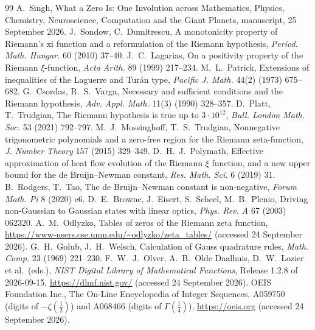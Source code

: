 \documentclass[11pt]{article}
\theoremstyle{definition}\newtheorem{definition}[theorem]{Definition}
\theoremstyle{remark}\newtheorem{remark}[theorem]{Remark}
\begin{document}
\begin{thebibliography}{99}
 A.~Singh, What a Zero Is: One Involution across Mathematics, Physics, Chemistry, Neuroscience, Computation and the Giant Planets, manuscript, 25 September 2026.
 J.~Sondow, C.~Dumitrescu, A monotonicity property of Riemann's xi function and a reformulation of the Riemann hypothesis, \emph{Period. Math. Hungar.} 60 (2010) 37--40.
 J.~C.~Lagarias, On a positivity property of the Riemann $\xi$-function, \emph{Acta Arith.} 89 (1999) 217--234.
 M.~L.~Patrick, Extensions of inequalities of the Laguerre and Tur\'an type, \emph{Pacific J. Math.} 44(2) (1973) 675--682.
 G.~Csordas, R.~S.~Varga, Necessary and sufficient conditions and the Riemann hypothesis, \emph{Adv. Appl. Math.} 11(3) (1990) 328--357.
 D.~Platt, T.~Trudgian, The Riemann hypothesis is true up to $3\cdot10^{12}$, \emph{Bull. London Math. Soc.} 53 (2021) 792--797.
 M.~J.~Mossinghoff, T.~S.~Trudgian, Nonnegative trigonometric polynomials and a zero-free region for the Riemann zeta-function, \emph{J. Number Theory} 157 (2015) 329--349.
 D.~H.~J.~Polymath, Effective approximation of heat flow evolution of the Riemann $\xi$ function, and a new upper bound for the de Bruijn--Newman constant, \emph{Res. Math. Sci.} 6 (2019) 31.
 B.~Rodgers, T.~Tao, The de Bruijn--Newman constant is non-negative, \emph{Forum Math. Pi} 8 (2020) e6.
 D.~E.~Browne, J.~Eisert, S.~Scheel, M.~B.~Plenio, Driving non-Gaussian to Gaussian states with linear optics, \emph{Phys. Rev. A} 67 (2003) 062320.
 A.~M.~Odlyzko, Tables of zeros of the Riemann zeta function, \url{https://www-users.cse.umn.edu/~odlyzko/zeta_tables/} (accessed 24 September 2026).
 G.~H.~Golub, J.~H.~Welsch, Calculation of Gauss quadrature rules, \emph{Math. Comp.} 23 (1969) 221--230.
 F.~W.~J.~Olver, A.~B.~Olde Daalhuis, D.~W.~Lozier et al.\ (eds.), \emph{NIST Digital Library of Mathematical Functions}, Release 1.2.8 of 2026-09-15, \url{https://dlmf.nist.gov/} (accessed 24 September 2026).
 OEIS Foundation Inc., The On-Line Encyclopedia of Integer Sequences, A059750 (digits of $-\zeta(\tfrac12)$) and A068466 (digits of $\Gamma(\tfrac14)$), \url{https://oeis.org} (accessed 24 September 2026).
\end{thebibliography}
\end{document}
